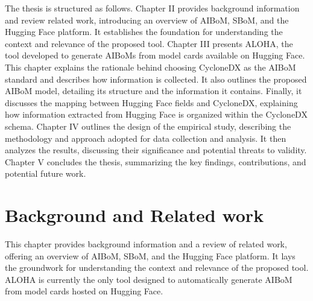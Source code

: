\documentclass[12pt,a4paper, oneside, openright]{book}
\newcommand{\aibom}{{AIBoM}\xspace}
\newcommand{\aiboms}{{AIBoMs}\xspace}
\newcommand{\sbom}{{SBoM}\xspace}
\begin{document}
The thesis is structured as follows. 
Chapter II provides background information and review related work, introducing an overview of \aibom, \sbom, and the Hugging Face platform. It establishes the foundation for understanding the context and relevance of the proposed tool. 
Chapter III presents ALOHA, the tool developed to generate \aiboms from model cards available on Hugging Face. This chapter explains the rationale behind choosing CycloneDX as the \aibom standard and describes how information is collected. It also outlines the proposed \aibom model, detailing its structure and the information it contains. Finally, it discusses the mapping between Hugging Face fields and CycloneDX, explaining how information extracted from Hugging Face is organized within the CycloneDX schema. 
Chapter IV outlines the design of the empirical study, describing the methodology and approach adopted for data collection and analysis. It then analyzes the results, discussing their significance and potential threats to validity. Chapter V concludes the thesis, summarizing the key findings, contributions, and potential future work.



\chapter{Background and Related work}
This chapter provides background information and a review of related work, offering an overview of \aibom, \sbom, and the Hugging Face platform. It lays the groundwork for understanding the context and relevance of the proposed tool. ALOHA is currently the only tool designed to automatically generate \aibom from model cards hosted on Hugging Face. %
\end{document}
